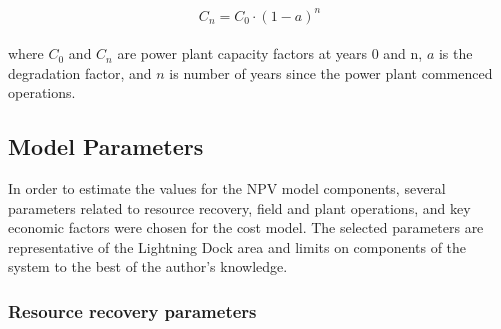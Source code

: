\begin{equation}
    \label{eq:degradation}
    C_n = C_0 \cdot (1-a)^n
\end{equation}
\\
where $C_0$ and $C_n$ are power plant capacity factors at years 0 and n, $a$ is the degradation factor, and $n$ is number of years since the power plant commenced operations.

\subsection{Model Parameters}
\label{ch4:cm_params}
In order to estimate the values for the NPV model components, several parameters related to resource recovery, field and plant operations, and key economic factors were chosen for the cost model. The selected parameters are representative of the Lightning Dock area and limits on components of the system to the best of the author's knowledge.

\subsubsection{Resource recovery parameters}

\begin{table}[!htp]
\centering
{}
\caption[Cost model parameters for resource recovery]{Parameters related to resource recovery in the cost model}
\label{tab:cm_resource_params}
\end{table}

